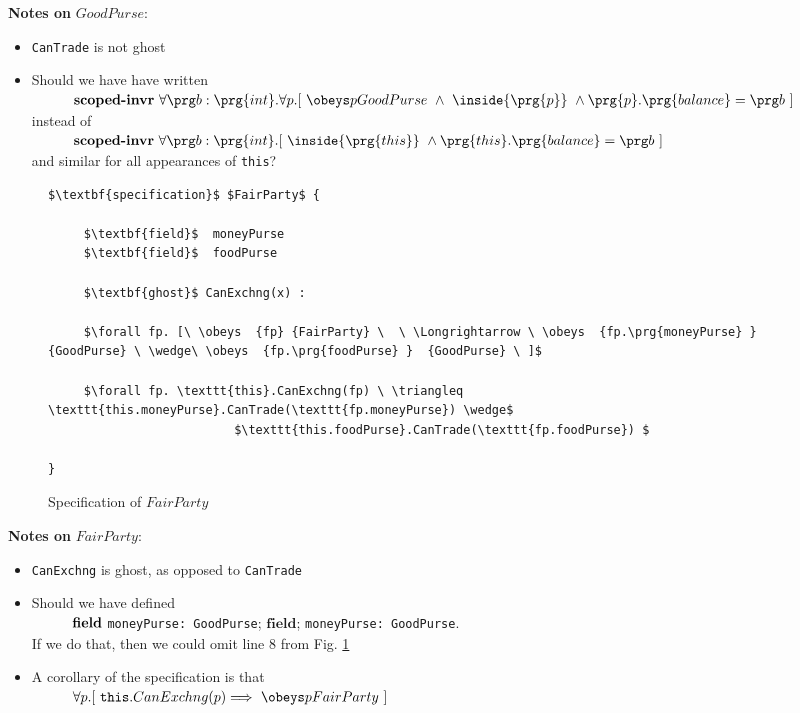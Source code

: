  \vspace{.2cm}
 
 \textbf{Notes on} $GoodPurse$:\\
 \begin{itemize}
 \item
 \texttt{CanTrade} is not ghost
 \item
 Should we have have written  \\
$\strut \hspace{1cm} \textbf{scoped-invr}\  \forall \prg b:\prg{int}.\forall p.[\ \obeys p {GoodPurse} \ \wedge\ \inside{\prg{p}}  \ \wedge \prg{p}.\prg{balance}=\prg b \ ]$ 
\\
instead of\\
$\strut \hspace{1cm} \textbf{scoped-invr}\  \forall \prg b:\prg{int}.[\ \inside{\prg{this}}  \ \wedge \prg{this}.\prg{balance}=\prg b \ ]$ 
\\
and similar for all appearances of \texttt{this}? 
\end{itemize}  
 
 
 \begin{figure}[t]
\begin{lstlisting}[mathescape=true, language=Chainmail, frame=lines]
$\textbf{specification}$ $FairParty$ {
    
     $\textbf{field}$  moneyPurse 
     $\textbf{field}$  foodPurse 
     
     $\textbf{ghost}$ CanExchng(x) :       
     
     $\forall fp. [\ \obeys  {fp} {FairParty} \  \ \Longrightarrow \ \obeys  {fp.\prg{moneyPurse} }  {GoodPurse} \ \wedge\ \obeys  {fp.\prg{foodPurse} }  {GoodPurse} \ ]$
      
     $\forall fp. \texttt{this}.CanExchng(fp) \ \triangleq \texttt{this.moneyPurse}.CanTrade(\texttt{fp.moneyPurse}) \wedge$   
                          $\texttt{this.foodPurse}.CanTrade(\texttt{fp.foodPurse}) $

}
\end{lstlisting}
\caption{Specification of  $FairParty$}
\label{fig:FairParty}
 \end{figure}
 
  \textbf{Notes on} $FairParty$:\\
 \begin{itemize}
 \item
 \texttt{CanExchng} is ghost, as opposed to \texttt{CanTrade}\\
\item
Should we have defined\\
$\strut \hspace{1cm} \textbf{field}$  \texttt{moneyPurse: GoodPurse};  $\textbf{field}$;  \texttt{moneyPurse: GoodPurse}. \\
If we do that, then we could omit line 8 from Fig. \ref{fig:FairParty}
\item
A corollary of the specification is that \\
$\strut \hspace{1cm} \forall p. [\ \texttt{this}.CanExchng(p) \Longrightarrow \ \obeys p {FairParty}\ ]$
 \end{itemize}  
 

